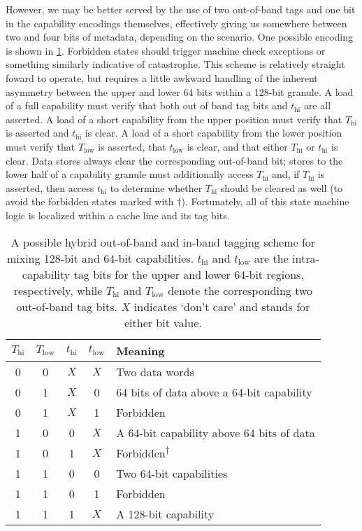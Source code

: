 However, we may be better served by the use of two out-of-band tags and one
bit in the capability encodings themselves, effectively giving us somewhere
between two and four bits of metadata, depending on the scenario.  One
possible encoding is shown in \cref{tab:shorttags}.  Forbidden states should
trigger machine check exceptions or something similarly indicative of
catastrophe.
%
This scheme is relatively straight foward to operate, but requires a little
awkward handling of the inherent asymmetry between the upper and lower 64
bits within a 128-bit granule.  A load of a full capability must verify that
both out of band tag bits and $t_\text{hi}$ are all asserted.  A load of a
short capability from the upper position must verify that $T_\text{hi}$ is
asserted and $t_\text{hi}$ is clear.  A load of a short capability from the
lower position must verify that $T_\text{low}$ is asserted, that
$t_\text{low}$ is clear, and that either $T_\text{hi}$ or $t_\text{hi}$ is
clear.  Data stores always clear the corresponding out-of-band bit; stores
to the lower half of a capability granule must additionally access
$T_\text{hi}$ and, if $T_\text{hi}$ is asserted, then access $t_\text{hi}$
to determine whether $T_\text{hi}$ should be cleared as well (to avoid the
forbidden states marked with $\dagger$).  Fortunately, all of this state
machine logic is localized within a cache line and its tag bits.

\begin{table}
\begin{center}
\begin{tabular}{cccc|l}

$T_\text{hi}$ & $T_\text{low}$ & $t_\text{hi}$ & $t_\text{low}$ & Meaning \\
\hline\hline

0 & 0 & $X$ & $X$ & Two data words \\
0 & 1 & $X$ & 0   & 64 bits of data above a 64-bit capability \\
0 & 1 & $X$ & 1   & Forbidden \\
1 & 0 & 0   & $X$ & A 64-bit capability above 64 bits of data \\
1 & 0 & 1   & $X$ & Forbidden\textsuperscript{$\dagger$} \\
1 & 1 & 0   & 0   & Two 64-bit capabilities \\
1 & 1 & 0   & 1   & Forbidden \\
1 & 1 & 1   & $X$ & A 128-bit capability \\

\end{tabular}
\end{center}

\caption{A possible hybrid out-of-band and in-band tagging scheme for mixing
128-bit and 64-bit capabilities.  $t_\text{hi}$ and $t_\text{low}$ are the
intra-capability tag bits for the upper and lower 64-bit regions,
respectively, while $T_\text{hi}$ and $T_\text{low}$ denote the
corresponding two out-of-band tag bits.  $X$ indicates `don't care' and
stands for either bit value.}

\label{tab:shorttags}
\end{table}

